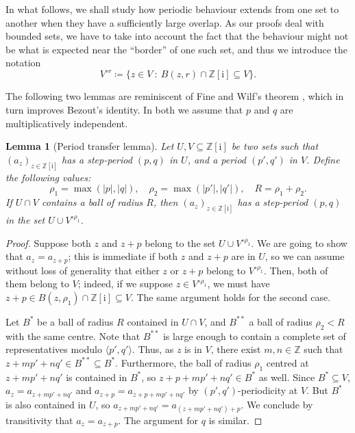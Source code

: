 \documentclass{amsart}
\newcommand{\Z}{\mathbb{Z}}
\newcommand{\ii}{\mathrm{i}}
\newtheorem*{main theorem}{Theorem \ref{thm:main-gaussian}}
\newtheorem{lemma}[theorem]{Lemma}
\theoremstyle{definition}
\begin{document}
In what follows, we shall study how periodic behaviour extends from one set to another when they have a sufficiently large overlap. As our proofs deal with bounded sets, we have to take into account the fact that the behaviour might not be what is expected near the ``border'' of one such set, and thus we introduce the notation
\[V^{\circ r} \coloneqq \{z\in V \::\: B(z,r)\cap\Z[\ii]\subseteq V \}.\]


The following  two lemmas are reminiscent of  Fine and Wilf's theorem \cite{Fine-Wilf}, which in turn improves Bezout's identity. In both we assume that $p$ and $q$ are multiplicatively independent.


\begin{lemma}[Period transfer lemma]\label{lem:period-transfer-lemma}
    Let $U,V\subseteq\Z[\ii]$ be two sets  such that $(a_z)_{z\in\Z[\ii]}$ has a step-period $(p,q)$ in $U$, and a period $(p',q')$ in $V$. Define the following values:
        \[ \rho_1=\max(\lvert p\rvert,\lvert q\rvert),\quad \rho_2=\max(\lvert p'\rvert,\lvert q'\rvert),\quad R=\rho_1+\rho_2.\]
    If $U\cap V$ contains a ball of radius $R$, then $(a_z)_{z\in\Z[\ii]}$ has a step-period $(p,q)$ in the set $U\cup V^{\circ \rho_1}$.
\end{lemma}

\begin{proof}
    Suppose both $z$ and $z+p$ belong to the set $U\cup V^{\circ \rho_1}$. We are going to show that $a_{z}=a_{z+p}$; this is immediate if both $z$ and $z+p$ are in $U$, so we can assume without loss of generality that either $z$ or $z+p$ belong to $V^{\circ \rho_1}$. Then, both of them belong to $V$; indeed, if we suppose $z\in V^{\circ \rho_1}$, we must have $z+p\in B(z,\rho_1)\cap\Z[\ii]\subseteq V$. The same argument holds for the second case.

    Let $B^*$ be a ball of radius $R$ contained in $U\cap V$, and $B^{**}$ a ball of radius $\rho_2<R$ with the same centre. Note that $B^{**}$ is large enough to contain a complete set of representatives modulo $\langle p',q'\rangle$. Thus, as $z$ is in $V$, there exist $m,n\in\Z$ such that $z+mp'+nq'\in B^{**}\subseteq B^*$. Furthermore, the ball of radius $\rho_1$ centred at $z+mp'+nq'$ is contained in $B^*$, so $z+p+mp'+nq'\in B^*$ as well. Since $B^*\subseteq V$, $a_z=a_{z+mp'+nq'}$ and $a_{z+p}=a_{z+p+mp'+nq'}$ by $(p',q')$-periodicity at $V$. But $B^*$ is also contained in $U$, so $a_{z+mp'+nq'}=a_{(z+mp'+nq')+p}$. We conclude by transitivity that $a_z=a_{z+p}$. The argument for $q$ is similar.
\end{proof}
\end{document}
